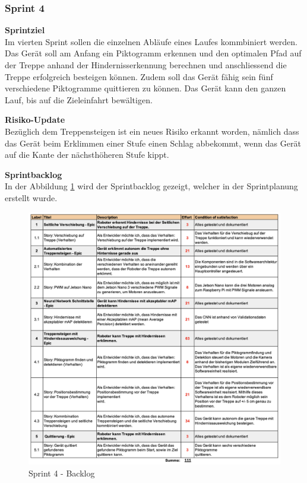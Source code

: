 \subsubsection{Sprint 4}
\textbf{Sprintziel}\\
Im vierten Sprint sollen die einzelnen Abläufe eines Laufes kommbiniert werden. Das Gerät soll am Anfang ein Piktogramm erkennen und den optimalen Pfad auf der Treppe anhand der Hindernisserkennung berechnen und anschliessend die Treppe erfolgreich besteigen können. Zudem soll das Gerät fähig sein fünf verschiedene Piktogramme quittieren zu können. Das Gerät kann den ganzen Lauf, bis auf die Zieleinfahrt bewältigen.

\textbf{Risiko-Update}\\
Bezüglich dem Treppensteigen ist ein neues Risiko erkannt worden, nämlich dass das Gerät beim Erklimmen einer Stufe einen Schlag abbekommt, wenn das Gerät auf die Kante der nächsthöheren Stufe kippt.

\textbf{Sprintbacklog}\\
In der Abbildung \ref{fig:sprint-backlog-4} wird der Sprintbacklog gezeigt, welcher in der Sprintplanung erstellt wurde.
\begin{figure}[H]
  \includegraphics[width=1.0\textwidth]{img/projektmanagement/Sprint 4.png}
  \centering
  \caption{Sprint 4 - Backlog}
  \label{fig:sprint-backlog-4}
\end{figure}

